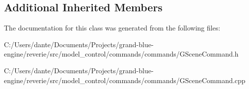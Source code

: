\subsection*{Additional Inherited Members}


The documentation for this class was generated from the following files\+:\begin{DoxyCompactItemize}
\item 
C\+:/\+Users/dante/\+Documents/\+Projects/grand-\/blue-\/engine/reverie/src/model\+\_\+control/commands/commands/G\+Scene\+Command.\+h\item 
C\+:/\+Users/dante/\+Documents/\+Projects/grand-\/blue-\/engine/reverie/src/model\+\_\+control/commands/commands/G\+Scene\+Command.\+cpp\end{DoxyCompactItemize}
